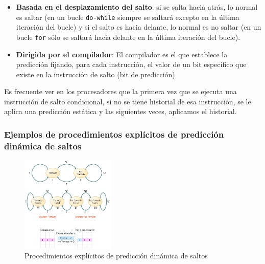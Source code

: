 \documentclass[10pt,a4paper,spanish]{report}
\begin{document}
\begin{enumerate}[\color{azul}{$\heartsuit$}]
\begin{enumerate}[$\longrightarrow$]
\begin{itemize}
            \item \textbf{\textcolor{azul}{Basada en el desplazamiento del salto}}: si se salta hacia atrás, lo normal es saltar (en un bucle \verb*|do-while| siempre se saltará excepto en la última iteración del bucle) y si el salto es hacia delante, lo normal es no saltar (en un bucle \verb*|for| sólo se saltará hacia delante en la última iteración del bucle).

            \item \textbf{\textcolor{azul}{Dirigida por el compilador}}: El compilador es el que establece la predicción fijando, para cada instrucción, el valor de un bit específico que existe en la instrucción de salto (bit de predicción)
        \end{itemize}
    \end{enumerate}
\end{enumerate}

Es frecuente ver en los procesadores que la primera vez que se ejecuta una instrucción de salto condicional, si no se tiene historial de esa instrucción, se le aplica una predicción estática y las siguientes veces, aplicamos el historial.

\textcolor{azul}{\subsubsection{Ejemplos de procedimientos explícitos de predicción dinámica de saltos}}

\begin{figure}[!h]
\centering
\includegraphics[width=0.4\textwidth]{105}
\caption{Procedimientos explícitos de predicción dinámica de saltos}
\label{ejemplos_saltos}
\end{figure}
\end{document}
